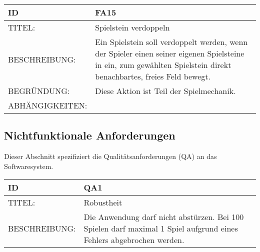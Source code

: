 \documentclass{uulm-assignment}
\begin{document}
\begin{tabularx}{16cm}{l|X}
\textbf{ID} & \textbf{FA15} \\
\hline
TITEL: & Spielstein verdoppeln \\
\hline
BESCHREIBUNG: & Ein Spielstein soll verdoppelt werden, wenn der Spieler einen seiner eigenen Spielsteine in ein, zum gewählten Spielstein direkt benachbartes, freies Feld bewegt.
\\
\hline
BEGRÜNDUNG: & Diese Aktion ist Teil der Spielmechanik. \\
\hline
ABHÄNGIGKEITEN: & \\
\end{tabularx}

\subsection{Nichtfunktionale Anforderungen}

Dieser Abschnitt spezifiziert die Qualitätsanforderungen (QA) an das Softwaresystem.

\begin{tabularx}{16cm}{l|X}
\textbf{ID} & \textbf{QA1} \\
\hline
TITEL: & Robustheit \\
\hline
BESCHREIBUNG: & Die Anwendung darf nicht abstürzen. Bei 100 Spielen darf maximal 1 Spiel
aufgrund eines Fehlers abgebrochen werden. \\
\end{tabularx}
\end{document}
